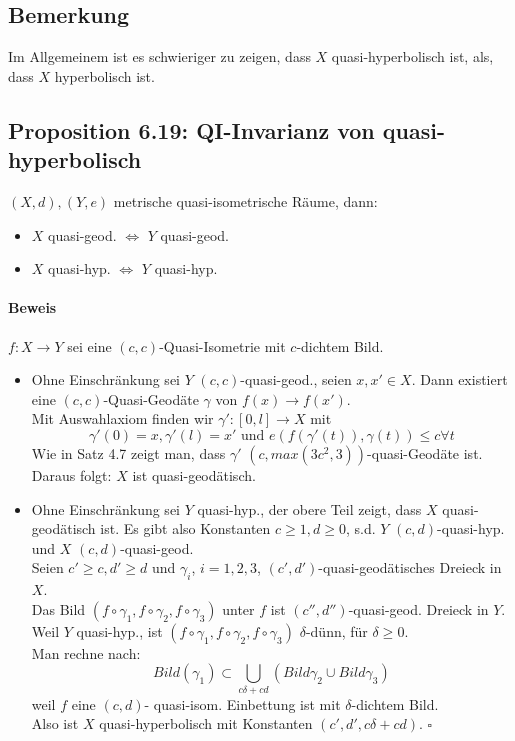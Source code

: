 \documentclass{article}
\newcommand{\qed}{\hfill $\square$}
\begin{document}
\subsection{Bemerkung}
Im Allgemeinem ist es schwieriger zu zeigen, dass $X$ quasi-hyperbolisch ist, als, dass $X$ hyperbolisch ist.

\subsection{Proposition 6.19: QI-Invarianz von quasi-hyperbolisch}
$(X,d), (Y, e)$ metrische quasi-isometrische Räume, dann:
\begin{itemize}
	\item $X$ quasi-geod. $\Longleftrightarrow$ $Y$ quasi-geod.
	\item $X$ quasi-hyp. $\Longleftrightarrow$ $Y$ quasi-hyp.
\end{itemize}



\paragraph{Beweis}
$f:X \rightarrow Y$ sei eine $(c,c)$-Quasi-Isometrie mit $c$-dichtem Bild.
\begin{itemize}
	\item Ohne Einschränkung sei $Y$  $(c,c)$-quasi-geod., seien $x,x'\in X$. Dann existiert eine $(c,c)$-Quasi-Geodäte $\gamma$ von $f(x)\rightarrow f(x')$.\\
	Mit Auswahlaxiom finden wir $\gamma':[0,l] \rightarrow X$ mit 
	\[\gamma'(0) = x, \gamma'(l)  = x' \text{ und } e(f(\gamma'(t)), \gamma(t)) \leq c \forall t \]
	Wie in Satz 4.7 zeigt man, dass $\gamma'$ $(c, max(3c^2, 3))$-quasi-Geodäte ist.\\
	Daraus folgt: $X$ ist quasi-geodätisch.
	
	\item Ohne Einschränkung sei $Y$  quasi-hyp., der obere Teil zeigt, dass $X$ quasi-geodätisch ist. Es gibt also Konstanten $c\geq 1, d \geq 0$, s.d. $Y$ $(c,d)$-quasi-hyp. und $X$ $(c,d)$-quasi-geod.\\
	Seien $c' \geq  c, d' \geq d$ und $\gamma_i$, $i = 1,2,3$, $(c',d')$-quasi-geodätisches Dreieck in $X$.\\
	Das Bild $(f\circ \gamma_1, f\circ \gamma_2, f\circ \gamma_3)$ unter $f$ ist $(c'', d'')$-quasi-geod. Dreieck in $Y$.\\
	Weil $Y$ quasi-hyp., ist $(f\circ \gamma_1, f\circ \gamma_2, f\circ \gamma_3 )$ $\delta$-dünn, für $\delta \geq 0$.\\
	Man rechne nach:
	\[Bild(\gamma_1) \subset \bigcup_{c\delta + cd}(Bild\gamma_2 \cup Bild \gamma_3) \]
	weil $f$ eine $(c,d)$- quasi-isom. Einbettung ist mit $\delta$-dichtem Bild.\\
	Also ist $X$ quasi-hyperbolisch mit Konstanten $(c', d', c\delta + cd)$. \qed
\end{itemize}
\end{document}
